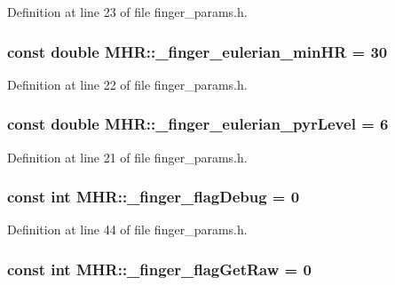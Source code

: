 Definition at line 23 of file finger\+\_\+params.\+h.

\hypertarget{namespace_m_h_r_a2d844de82559885b3d8a333c82b1a733}{
\subsubsection[{\+\_\+finger\+\_\+eulerian\+\_\+min\+H\+R}]{\setlength{\rightskip}{0pt plus 5cm}const double M\+H\+R\+::\+\_\+finger\+\_\+eulerian\+\_\+min\+H\+R = 30}}\label{namespace_m_h_r_a2d844de82559885b3d8a333c82b1a733}


Definition at line 22 of file finger\+\_\+params.\+h.

\hypertarget{namespace_m_h_r_a197af9978c9b4d443571197f5ad1b019}{
\subsubsection[{\+\_\+finger\+\_\+eulerian\+\_\+pyr\+Level}]{\setlength{\rightskip}{0pt plus 5cm}const double M\+H\+R\+::\+\_\+finger\+\_\+eulerian\+\_\+pyr\+Level = 6}}\label{namespace_m_h_r_a197af9978c9b4d443571197f5ad1b019}


Definition at line 21 of file finger\+\_\+params.\+h.

\hypertarget{namespace_m_h_r_aefc7157a4757a4b9017c968a17fb8ee1}{
\subsubsection[{\+\_\+finger\+\_\+flag\+Debug}]{\setlength{\rightskip}{0pt plus 5cm}const int M\+H\+R\+::\+\_\+finger\+\_\+flag\+Debug = 0}}\label{namespace_m_h_r_aefc7157a4757a4b9017c968a17fb8ee1}


Definition at line 44 of file finger\+\_\+params.\+h.

\hypertarget{namespace_m_h_r_a24fb7c804c7833388056a5e417354257}{
\subsubsection[{\+\_\+finger\+\_\+flag\+Get\+Raw}]{\setlength{\rightskip}{0pt plus 5cm}const int M\+H\+R\+::\+\_\+finger\+\_\+flag\+Get\+Raw = 0}}\label{namespace_m_h_r_a24fb7c804c7833388056a5e417354257}


